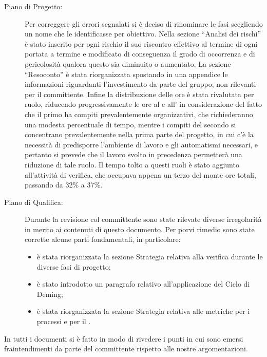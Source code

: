 \begin{description}
\item[Piano di Progetto:] Per correggere gli errori segnalati si è deciso di rinominare le fasi scegliendo un nome che le identificasse per obiettivo. Nella sezione “Analisi dei rischi” è stato inserito per ogni rischio il suo riscontro effettivo al termine di ogni  portata a termine e modificato di conseguenza il grado di occorrenza e di pericolosità qualora questo sia diminuito o aumentato. La sezione “Resoconto” è stata riorganizzata spostando in una appendice le informazioni riguardanti l'investimento da parte del gruppo, non rilevanti per il committente. Infine la distribuzione delle ore è stata rivalutata per ruolo, riducendo progressivamente le ore al  e all' in considerazione del fatto che il primo ha compiti prevalentemente organizzativi, che richiederanno una modesta percentuale di tempo, mentre i compiti del secondo si concentrano prevalentemente nella prima parte del progetto, in cui c'è la necessità di predisporre l'ambiente di lavoro e gli automatismi necessari, e pertanto si prevede che il lavoro svolto in precedenza permetterà una riduzione di tale ruolo. Il tempo tolto a questi ruoli è stato aggiunto all'attività di verifica, che occupava appena un terzo del monte ore totali, passando da 32\% a 37\%.
\item[Piano di Qualifica:] Durante la revisione col committente sono state rilevate diverse irregolarità in merito ai contenuti di questo documento. Per porvi rimedio sono state corrette alcune parti fondamentali, in particolare:
\begin{itemize}
\item è stata riorganizzata la sezione Strategia relativa alla verifica durante le diverse fasi di progetto;
\item è stato introdotto un paragrafo relativo all'applicazione del Ciclo di Deming;
\item è stata riorganizzata la sezione Strategia relativa alle metriche per i processi e per il .
\end{itemize}
\end{description}
In tutti i documenti si è fatto in modo di rivedere i punti in cui sono emersi fraintendimenti da parte del committente rispetto alle nostre argomentazioni.
